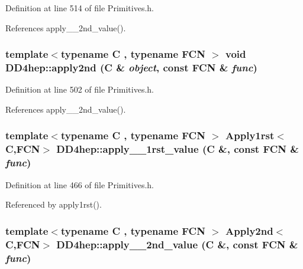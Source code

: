 Definition at line 514 of file Primitives.h.

References apply\_\-\_\-2nd\_\-value().\hypertarget{namespace_d_d4hep_a4baf120e3ac805eb41cd8d5f7d901f22}{
\subsubsection[{apply2nd}]{\setlength{\rightskip}{0pt plus 5cm}template$<$typename C , typename FCN $>$ void DD4hep::apply2nd (C \& {\em object}, \/  const FCN \& {\em func})}}
\label{namespace_d_d4hep_a4baf120e3ac805eb41cd8d5f7d901f22}


Definition at line 502 of file Primitives.h.

References apply\_\-\_\-2nd\_\-value().\hypertarget{namespace_d_d4hep_a22e8e99463908c856fb454c15bc7ab17}{
\subsubsection[{apply\_\-\_\-1rst\_\-value}]{\setlength{\rightskip}{0pt plus 5cm}template$<$typename C , typename FCN $>$ {\bf Apply1rst}$<$C,FCN$>$ DD4hep::apply\_\-\_\-1rst\_\-value (C \&, \/  const FCN \& {\em func})}}
\label{namespace_d_d4hep_a22e8e99463908c856fb454c15bc7ab17}


Definition at line 466 of file Primitives.h.

Referenced by apply1rst().\hypertarget{namespace_d_d4hep_a9d26642403053ea0be3a5892db7f2d2d}{
\subsubsection[{apply\_\-\_\-2nd\_\-value}]{\setlength{\rightskip}{0pt plus 5cm}template$<$typename C , typename FCN $>$ {\bf Apply2nd}$<$C,FCN$>$ DD4hep::apply\_\-\_\-2nd\_\-value (C \&, \/  const FCN \& {\em func})}}
\label{namespace_d_d4hep_a9d26642403053ea0be3a5892db7f2d2d}


